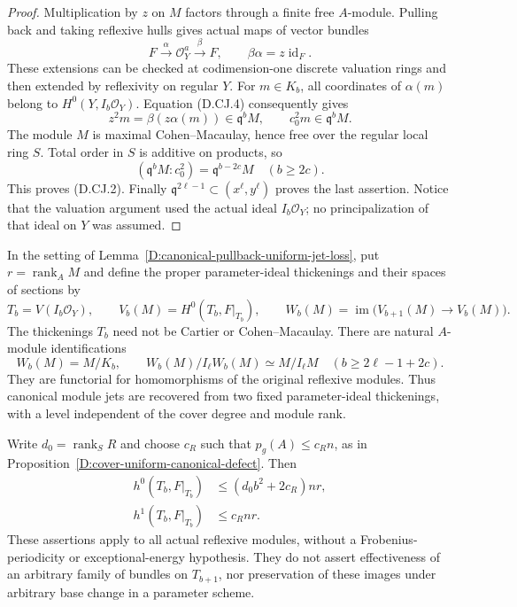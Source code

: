 \begin{proof}
Multiplication by $z$ on $M$ factors through a finite free
$A$-module. Pulling back and taking reflexive hulls gives actual
maps of vector bundles
\[
                 F\xrightarrow{\alpha}\mathcal O_Y^a
                     \xrightarrow{\beta}F,
                 \qquad\beta\alpha=z\operatorname{id}_F.
                                                        \tag{D.CJ.5}
\]
These extensions can be checked at codimension-one discrete
valuation rings and then extended by reflexivity on regular $Y$.
For $m\in K_b$, all coordinates of $\alpha(m)$ belong to
$H^0(Y,I_b\mathcal O_Y)$. Equation (D.CJ.4) consequently gives
\[
 z^2m=\beta(z\alpha(m))\in\mathfrak q^bM,
          \qquad c_0^2m\in\mathfrak q^bM.
\]
The module $M$ is maximal Cohen--Macaulay, hence free over the
regular local ring $S$. Total order in $S$ is additive on
products, so
\[
       (\mathfrak q^bM:c_0^2)=\mathfrak q^{b-2c}M
                   \quad(b\ge2c).
\]
This proves (D.CJ.2). Finally
$\mathfrak q^{2\ell-1}\subset(x^\ell,y^\ell)$ proves the
last assertion. Notice that the valuation argument used the
actual ideal $I_b\mathcal O_Y$; no principalization of that
ideal on $Y$ was assumed.
\end{proof}

\begin{proposition}
\label{D:canonical-module-two-level-recovery}
In the setting of Lemma~\ref{D:canonical-pullback-uniform-jet-loss},
put $r=\operatorname{rank}_A M$ and define the proper parameter-ideal
thickenings and their spaces of sections by
\[
 T_b=V(I_b\mathcal O_Y),\qquad
 V_b(M)=H^0(T_b,F|_{T_b}),\qquad
 W_b(M)=\operatorname{im}\bigl(V_{b+1}(M)\longrightarrow V_b(M)\bigr).
                                                        \tag{D.CJ.6}
\]
The thickenings $T_b$ need not be Cartier or Cohen--Macaulay.
There are natural $A$-module identifications
\[
             W_b(M)=M/K_b,
 \qquad
             W_b(M)/I_\ell W_b(M)\simeq M/I_\ell M
                  \quad(b\ge2\ell-1+2c).
                                                        \tag{D.CJ.7}
\]
They are functorial for homomorphisms of the original reflexive
modules. Thus canonical module jets are recovered from two fixed
parameter-ideal thickenings, with a level independent of the cover
degree and module rank.

Write $d_0=\operatorname{rank}_S R$ and choose $c_R$ such that
$p_g(A)\le c_Rn$, as in
Proposition~\ref{D:cover-uniform-canonical-defect}. Then
\[
 \begin{split}
 h^0(T_b,F|_{T_b})&\le (d_0b^2+2c_R)nr,\\
 h^1(T_b,F|_{T_b})&\le c_Rnr.
 \end{split}                                             \tag{D.CJ.8}
\]
These assertions apply to all actual reflexive modules, without
a Frobenius-periodicity or exceptional-energy hypothesis.
They do not assert effectiveness of an arbitrary family of bundles
on $T_{b+1}$, nor preservation of these images under arbitrary
base change in a parameter scheme.
\end{proposition}

